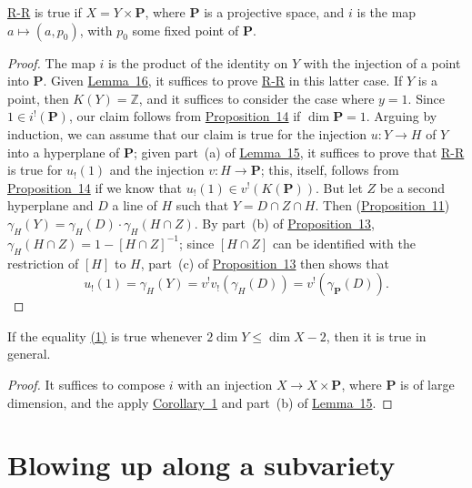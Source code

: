 \documentclass{article}
\theoremstyle{plain}
\newenvironment{cor}[1]
    {\renewcommand\theinnercor{#1}\innercor}
    {\endinnercor}
\theoremstyle{definition}
\newcommand{\PP}{\mathbf{P}}
\renewcommand{\leq}{\leqslant}
\begin{document}
\begin{cor}{1}
\label{corollary1}
  \hyperref[theoremriemannroch]{R-R} is true if $X=Y\times\PP$, where $\PP$ is a projective space, and $i$ is the map $a\mapsto(a,p_0)$, with $p_0$ some fixed point of $\PP$.
\end{cor}

\begin{proof}
  The map $i$ is the product of the identity on $Y$ with the injection of a point into $\PP$.
  Given \hyperref[lemma16]{Lemma~16}, it suffices to prove \hyperref[theoremriemannroch]{R-R} in this latter case.
  If $Y$ is a point, then $K(Y)=\mathbb{Z}$, and it suffices to consider the case where $y=1$.
  Since $1\in i^!(\PP)$, our claim follows from \hyperref[proposition14]{Proposition~14} if $\dim\PP=1$.
  Arguing by induction, we can assume that our claim is true for the injection $u\colon Y\to H$ of $Y$ into a hyperplane of $\PP$;
  given part~(a) of \hyperref[lemma15]{Lemma~15}, it suffices to prove that \hyperref[theoremriemannroch]{R-R} is true for $u_!(1)$ and the injection $v\colon H\to \PP$;
  this, itself, follows from \hyperref[proposition14]{Proposition~14} if we know that $u_!(1)\in v^!(K(\PP))$.
  But let $Z$ be a second hyperplane and $D$ a line of $H$ such that $Y=D\cap Z\cap H$.
  Then (\hyperref[proposition11]{Proposition~11}) $\gamma_H(Y) = \gamma_H(D)\cdot\gamma_H(H\cap Z)$.
  By part~(b) of \hyperref[proposition13]{Proposition~13}, $\gamma_H(H\cap Z)=1-[H\cap Z]^{-1}$;
  since $[H\cap Z]$ can be identified with the restriction of $[H]$ to $H$, part~(c) of \hyperref[proposition13]{Proposition~13} then shows that
  \[
    u_!(1) = \gamma_H(Y) = v^!v_!(\gamma_H(D)) = v^!(\gamma_{\PP}(D)).
  \]
\end{proof}

\begin{cor}{2}
\label{corollary2}
  If the equality \hyperref[section11equation1]{(1)} is true whenever $2\dim Y\leq\dim X-2$, then it is true in general.
\end{cor}

\begin{proof}
  It suffices to compose $i$ with an injection $X\to X\times\PP$, where $\PP$ is of large dimension, and the apply \hyperref[corollary1]{Corollary~1} and part~(b) of \hyperref[lemma15]{Lemma~15}.
\end{proof}


\section{Blowing up along a subvariety}
\label{section12}
\end{document}
